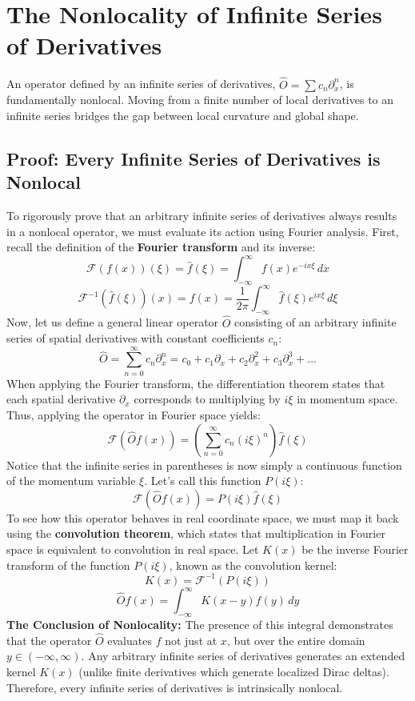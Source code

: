 \documentclass[11pt, a4paper]{article}
\begin{document}
\section{The Nonlocality of Infinite Series of Derivatives}
An operator defined by an infinite series of derivatives, $\hat{O} = \sum c_n \partial_x^n$, is fundamentally nonlocal. Moving from a finite number of local derivatives to an infinite series bridges the gap between local curvature and global shape.

\subsection{Proof: Every Infinite Series of Derivatives is Nonlocal}
To rigorously prove that an arbitrary infinite series of derivatives always results in a nonlocal operator, we must evaluate its action using Fourier analysis. First, recall the definition of the \textbf{Fourier transform} and its inverse:
\[
\mathcal{F}(f(x))(\xi) = \hat{f}(\xi) = \int_{-\infty}^{\infty} f(x) e^{-i x \xi} \, dx
\]
\[
\mathcal{F}^{-1}(\hat{f}(\xi))(x) = f(x) = \frac{1}{2\pi} \int_{-\infty}^{\infty} \hat{f}(\xi) e^{i x \xi} \, d\xi
\]
Now, let us define a general linear operator $\hat{O}$ consisting of an arbitrary infinite series of spatial derivatives with constant coefficients $c_n$:
\[
\hat{O} = \sum_{n=0}^{\infty} c_n \partial_x^n = c_0 + c_1 \partial_x + c_2 \partial_x^2 + c_3 \partial_x^3 + \dots
\]
When applying the Fourier transform, the differentiation theorem states that each spatial derivative $\partial_x$ corresponds to multiplying by $i\xi$ in momentum space. Thus, applying the operator in Fourier space yields:
\[
\mathcal{F}(\hat{O} f(x)) = \left( \sum_{n=0}^{\infty} c_n (i\xi)^n \right) \hat{f}(\xi)
\]
Notice that the infinite series in parentheses is now simply a continuous function of the momentum variable $\xi$. Let's call this function $P(i\xi)$:
\[
\mathcal{F}(\hat{O} f(x)) = P(i\xi) \hat{f}(\xi)
\]
To see how this operator behaves in real coordinate space, we must map it back using the \textbf{convolution theorem}, which states that multiplication in Fourier space is equivalent to convolution in real space. Let $K(x)$ be the inverse Fourier transform of the function $P(i\xi)$, known as the convolution kernel:
\[
K(x) = \mathcal{F}^{-1}(P(i\xi))
\]
\[
\hat{O} f(x) = \int_{-\infty}^{\infty} K(x-y) f(y) \, dy
\]
\textbf{The Conclusion of Nonlocality:} The presence of this integral demonstrates that the operator $\hat{O}$ evaluates $f$ not just at $x$, but over the entire domain $y \in (-\infty, \infty)$. Any arbitrary infinite series of derivatives generates an extended kernel $K(x)$ (unlike finite derivatives which generate localized Dirac deltas). Therefore, every infinite series of derivatives is intrinsically nonlocal.
\end{document}
